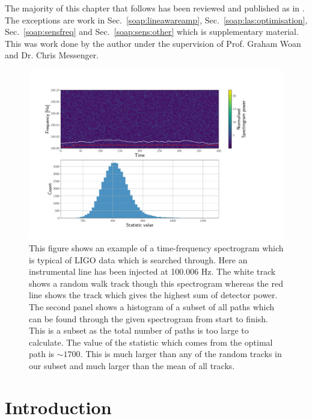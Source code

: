 The majority of this chapter that follows has been reviewed and published as in
\citep{bayley2019GeneralizedApplication}.  The
exceptions are work in Sec.~\ref{soap:lineawareamp},
Sec.~\ref{soap:las:optimisation}, Sec.~\ref{soap:sensfreq} and
Sec.~\ref{soap:sens:other} which is supplementary material.
This was work done by the author
under the supervision of Prof. Graham Woan and Dr. Chris Messenger.


\begin{figure}

\centering
\includegraphics[width=\linewidth]{C3_soap/soap_spect_motivation.pdf}
\caption[Example of frequency tracks through a spectrogram and their summed power.]{This figure shows an example of a time-frequency spectrogram which is typical of \gls{LIGO} data which is searched through. Here an instrumental line has been injected at 100.006 Hz. The white track shows a random walk track though this spectrogram whereas the red line shows the track which gives the highest sum of detector power. The second panel shows a histogram of a subset of all paths which can be found through the given spectrogram from start to finish. This is a subset as the total number of paths is too large to calculate. The value of the statistic which comes from the optimal path is $\sim1700$. This is much larger than any of the random tracks in our subset and much larger than the mean of all tracks. }
\label{soap:motivation:plot}

\end{figure}

\section{Introduction}

